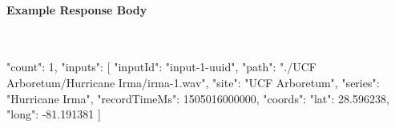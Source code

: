 \paragraph{Example Response Body} \mbox{}\\[\codeheaderspace]
\begin{jsoncode}
{
  "count": 1,
  "inputs": [
    {
      "inputId": "input-1-uuid",
      "path": "./UCF Arboretum/Hurricane Irma/irma-1.wav",
      "site": "UCF Arboretum",
      "series": "Hurricane Irma",
      "recordTimeMs": 1505016000000,
      "coords": {
        "lat": 28.596238,
        "long": -81.191381
      }
    }
  ]
}
\end{jsoncode}

